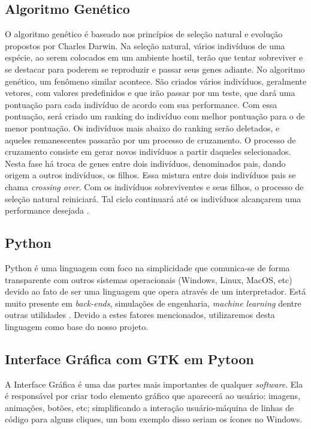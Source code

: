 \documentclass[brazilian]{ifsc-tcc}
\begin{document}
\subsection{Algoritmo Genético}
O algoritmo genético é baseado nos princípios de seleção natural e evolução propostos por Charles Darwin. Na seleção natural, vários indivíduos de uma espécie, ao serem colocados em um ambiente hostil, terão que tentar sobreviver e se destacar para poderem se reproduzir e passar seus genes adiante. No algoritmo genético, um fenômeno similar acontece. São criados vários indivíduos, geralmente vetores, com valores predefinidos e que irão passar por um teste, que dará uma pontuação para cada indivíduo de acordo com sua performance. Com essa pontuação, será criado um ranking do indivíduo com melhor pontuação para o de menor pontuação. Os indivíduos mais abaixo do ranking serão deletados, e aqueles remanescentes passarão por um processo de cruzamento. O processo de cruzamento consiste em gerar novos indivíduos a partir daqueles selecionados. Nesta fase há troca de genes entre dois indivíduos, denominados pais, dando origem a outros indivíduos, os filhos. Essa mistura entre dois indivíduos pais se chama \textit{crossing over}. Com os indivíduos sobreviventes e seus filhos, o processo de seleção natural reiniciará. Tal ciclo continuará até os indivíduos alcançarem uma performance desejada \cite{livro-algoritmo-genetico}.

\subsection{Python}
Python é uma linguagem com foco na simplicidade que comunica-se de forma transparente com outros sistemas operacionais (Windows, Linux, MacOS, etc) devido ao fato de ser uma linguagem que opera através de um interpretador. Está muito presente em \textit{back-ends}, simulações de engenharia, \textit{machine learning} dentre outras utilidades \cite{Python}. Devido a estes fatores mencionados, utilizaremos desta linguagem como base do nosso projeto.

\subsection{Interface Gráfica com GTK em Pytoon}
A Interface Gráfica é uma das partes mais importantes de qualquer \textit{software}. Ela é responsável por criar todo elemento gráfico que aparecerá ao usuário: imagens, animações, botões, etc; simplificando a interação usuário-máquina de linhas de código para alguns cliques, um bom exemplo disso seriam os ícones no Windows.
\end{document}
